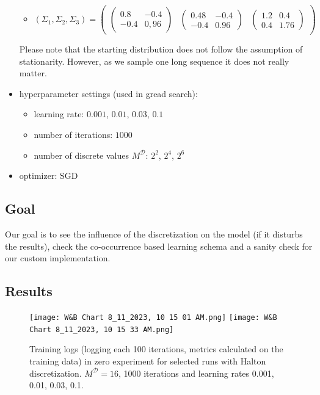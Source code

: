 \documentclass[shortabstract]{iithesis}
\begin{document}
\begin{itemize}
\begin{itemize}
        \item $(\Sigma_1, \Sigma_2, \Sigma_3) = \left(\begin{array}{ccc}\left(\begin{array}{cc} 0.8 & -0.4 \\ -0.4 & 0,96 \end{array}\right) & \left(\begin{array}{cc} 0.48 & -0.4 \\ -0.4 & 0.96 \end{array}\right) & \left(\begin{array}{cc} 1.2 & 0.4 \\ 0.4 & 1.76 \end{array}\right)\end{array}\right)$ 
    \end{itemize}
    Please note that the starting distribution does not follow the assumption of stationarity. However, as we sample one long sequence it does not really matter. 
    \item hyperparameter settings (used in gread search):
    \begin{itemize}
        \item learning rate: $0.001$, $0.01$, $0.03$, $0.1$
        \item number of iterations: $1000$
        \item number of discrete values $M^{\mathcal D}$: $2^2$, $2^4$, $2^6$
    \end{itemize}
    \item optimizer: SGD
\end{itemize}

\subsection{Goal} 

Our goal is to see the influence of the discretization on the model (if it disturbs the results), check the co-occurrence based learning schema and a sanity check for our custom implementation. 

\subsection{Results}

\begin{figure}[!ht]
    \centering
    \texttt{[image: W\&B Chart 8\_11\_2023, 10 15 01 AM.png]}
    \texttt{[image: W\&B Chart 8\_11\_2023, 10 15 33 AM.png]}
    \caption{Training logs (logging each 100 iterations, metrics calculated on the training data) in zero experiment for selected runs with Halton discretization. $M^{\mathcal D} = 16$, 1000 iterations and learning rates 0.001, 0.01, 0.03, 0.1.}
    \label{fig:training0}
\end{figure}
\end{document}
